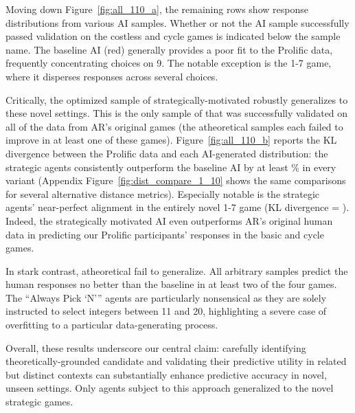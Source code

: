 Moving down Figure~\ref{fig:all_110_a}, the remaining rows show response distributions from various AI samples.
Whether or not the AI sample successfully passed validation on the costless and cycle games is indicated below the sample name.
The baseline AI (red) generally provides a poor fit to the Prolific data, frequently concentrating choices on 9. 
The notable exception is the 1-7 game, where it disperses responses across several choices.

Critically, the optimized sample of strategically-motivated  robustly generalizes to these novel settings.
This is the only sample of  that was successfully validated on all of the data from AR's original games (the atheoretical samples each failed to improve in at least one of these games).
Figure~\ref{fig:all_110_b} reports the KL divergence between the Prolific data and each AI-generated distribution: the strategic agents consistently outperform the baseline AI by at least \MinPercImproveArad\% in every variant (Appendix Figure~\ref{fig:dist_compare_1_10} shows the same comparisons for several alternative distance metrics). 
Especially notable is the strategic agents' near-perfect alignment in the entirely novel 1-7 game (KL divergence = \KlHumanOptDistSeven). 
Indeed, the strategically motivated AI even outperforms AR's original human data in predicting our Prolific participants' responses in the basic and cycle games.

In stark contrast, atheoretical  fail to generalize.
All arbitrary samples predict the human responses no better than the baseline in at least two of the four games.
The  ``Always Pick `N''' agents are particularly nonsensical as they are solely instructed to select integers between 11 and 20, 
highlighting a severe case of overfitting to a particular data-generating process.

Overall, these results underscore our central claim: carefully identifying theoretically-grounded candidate  and validating their predictive utility in related but distinct contexts can substantially enhance predictive accuracy in novel, unseen settings.
Only agents subject to this approach generalized to the novel strategic games. 
